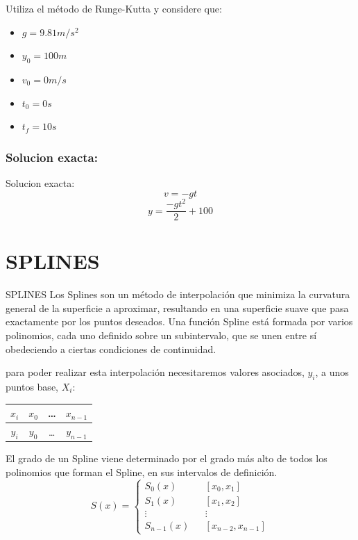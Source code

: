 \documentclass[11pt]{beamer}
\begin{document}
			\begin{frame}
				Utiliza el método de Runge-Kutta y considere que:
				\begin{itemize}
					\item $ g = 9.81 m/s^2 $
					\item $ y_0 = 100 m $
					\item $ v_0 = 0 m/s $
					\item $ t_0 = 0 s $
					\item $ t_f = 10 s $
				\end{itemize}
			\end{frame}

			\subsubsection{Solucion exacta:}
				\begin{frame}{Solucion exacta:}
					$$ v = -gt $$
					$$ y = \frac{-gt^2}{2} + 100 $$

				\end{frame}
				

	\section{SPLINES}
		\begin{frame}{SPLINES}
			Los Splines son un método de interpolación que minimiza la curvatura general de
			la superficie a aproximar, resultando en una superficie suave que pasa exactamente
			por los puntos deseados.
			Una función Spline está formada por varios polinomios, cada uno definido sobre
			un subintervalo, que se unen entre sí obedeciendo a ciertas condiciones de continuidad.
		\end{frame}

		\begin{frame}
			para poder realizar esta interpolación necesitaremos valores asociados, $y_i$, 
			a unos puntos base, $X_i$:
			\begin{table}[h!]
				\centering
				\begin{tabular}{c|    c    c    c}
					$ x_i $ & $x_0$ & \dots & $x_{n-1}$ \\\hline
					$ y_i $ & $y_0$ & \dots & $y_{n-1}$ \\						
				\end{tabular}
			\end{table}
			El grado de un Spline viene determinado por el grado más alto de todos los polinomios 
			que forman el Spline, en sus intervalos de definición.
			$$ S(x) = 
			\left\lbrace\begin{array}{cccc}
				S_0(x) &  & [x_0,x_1] \\
				S_1(x) &  & [x_1,x_2] \\
				 \vdots &  & \vdots \\
				S_{n-1}(x) &  & [x_{n-2},x_{n-1}]
		    \end{array}\right.
			$$
		\end{frame}
\end{document}
